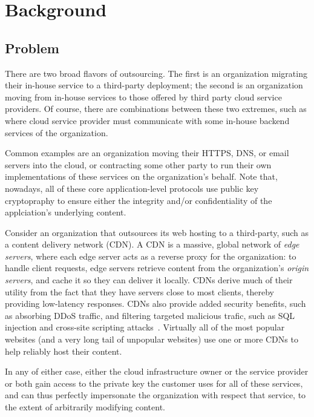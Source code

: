 \section{Background}
\label{sec:background}


\subsection{Problem}

There are two broad flavors of outsourcing.
%
The first is an organization migrating their in-house service to a third-party
deployment; the second is an organization  moving from in-house services to
those offered by third party cloud service providers.
%
Of course, there are combinations between these two extremes, such as where
cloud service provider must communicate with some in-house backend services of
the organization.


Common examples are an organization moving their HTTPS, DNS, or email servers
into the cloud, or contracting some other party to run their own
implementations of these services on the organization's behalf.
%
Note that, nowadays, all of these core application-level protocols use public
key cryptopraphy to ensure either the integrity and/or confidentiality of the
applciation's underlying content.


Consider an organization that outsources its web hosting to a third-party,
such as a content delivery network (CDN)\@.
%
A CDN is a massive, global network of \emph{edge servers}, where each edge
server acts as a reverse proxy for the organization: to
handle client requests, edge servers retrieve content from the organization's
\emph{origin servers}, and cache it so they can deliver it locally.
%
CDNs derive much of their utility from the fact that they have servers close to
most clients, thereby providing low-latency responses.
%
CDNs also provide added security benefits, such as absorbing DDoS
traffic, and filtering targeted malicious trafic, such as SQL injection and
cross-site scripting attacks~\cite{securing-cdns}.
%
Virtually all of the most popular websites (and a very long tail of unpopular
websites) use one or more CDNs to help reliably host their content.


In any of either case, either the cloud infrastructure owner or the service
provider or both gain access to the private key the customer uses for all of
these services, and can thus perfectly impersonate the organization with
respect that service, to the extent of arbitrarily modifying content.


